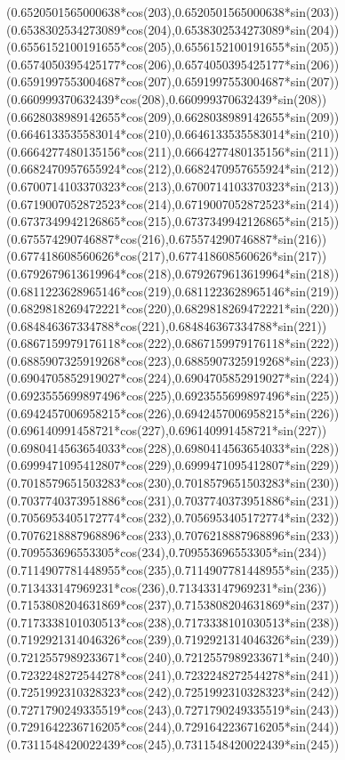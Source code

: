 {({0.6520501565000638*cos(203)},{0.6520501565000638*sin(203)})
({0.6538302534273089*cos(204)},{0.6538302534273089*sin(204)})
({0.6556152100191655*cos(205)},{0.6556152100191655*sin(205)})
({0.6574050395425177*cos(206)},{0.6574050395425177*sin(206)})
({0.6591997553004687*cos(207)},{0.6591997553004687*sin(207)})
({0.660999370632439*cos(208)},{0.660999370632439*sin(208)})
({0.6628038989142655*cos(209)},{0.6628038989142655*sin(209)})
({0.6646133535583014*cos(210)},{0.6646133535583014*sin(210)})
({0.6664277480135156*cos(211)},{0.6664277480135156*sin(211)})
({0.6682470957655924*cos(212)},{0.6682470957655924*sin(212)})
({0.6700714103370323*cos(213)},{0.6700714103370323*sin(213)})
({0.6719007052872523*cos(214)},{0.6719007052872523*sin(214)})
({0.6737349942126865*cos(215)},{0.6737349942126865*sin(215)})
({0.675574290746887*cos(216)},{0.675574290746887*sin(216)})
({0.677418608560626*cos(217)},{0.677418608560626*sin(217)})
({0.6792679613619964*cos(218)},{0.6792679613619964*sin(218)})
({0.6811223628965146*cos(219)},{0.6811223628965146*sin(219)})
({0.6829818269472221*cos(220)},{0.6829818269472221*sin(220)})
({0.684846367334788*cos(221)},{0.684846367334788*sin(221)})
({0.6867159979176118*cos(222)},{0.6867159979176118*sin(222)})
({0.6885907325919268*cos(223)},{0.6885907325919268*sin(223)})
({0.6904705852919027*cos(224)},{0.6904705852919027*sin(224)})
({0.6923555699897496*cos(225)},{0.6923555699897496*sin(225)})
({0.6942457006958215*cos(226)},{0.6942457006958215*sin(226)})
({0.696140991458721*cos(227)},{0.696140991458721*sin(227)})
({0.6980414563654033*cos(228)},{0.6980414563654033*sin(228)})
({0.6999471095412807*cos(229)},{0.6999471095412807*sin(229)})
({0.7018579651503283*cos(230)},{0.7018579651503283*sin(230)})
({0.7037740373951886*cos(231)},{0.7037740373951886*sin(231)})
({0.7056953405172774*cos(232)},{0.7056953405172774*sin(232)})
({0.7076218887968896*cos(233)},{0.7076218887968896*sin(233)})
({0.709553696553305*cos(234)},{0.709553696553305*sin(234)})
({0.7114907781448955*cos(235)},{0.7114907781448955*sin(235)})
({0.713433147969231*cos(236)},{0.713433147969231*sin(236)})
({0.7153808204631869*cos(237)},{0.7153808204631869*sin(237)})
({0.7173338101030513*cos(238)},{0.7173338101030513*sin(238)})
({0.7192921314046326*cos(239)},{0.7192921314046326*sin(239)})
({0.7212557989233671*cos(240)},{0.7212557989233671*sin(240)})
({0.7232248272544278*cos(241)},{0.7232248272544278*sin(241)})
({0.7251992310328323*cos(242)},{0.7251992310328323*sin(242)})
({0.7271790249335519*cos(243)},{0.7271790249335519*sin(243)})
({0.7291642236716205*cos(244)},{0.7291642236716205*sin(244)})
({0.7311548420022439*cos(245)},{0.7311548420022439*sin(245)})
}
